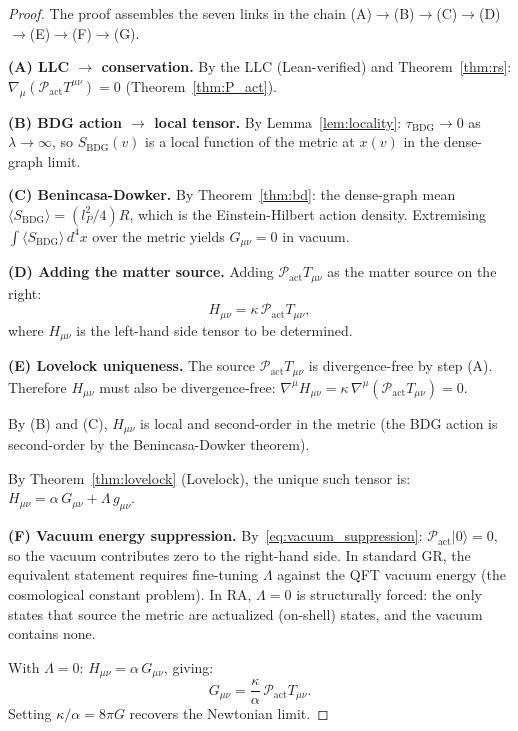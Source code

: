 \documentclass[11pt,a4paper]{article}
\newcommand{\Pact}{\mathcal{P}_{\mathrm{act}}}
\newcommand{\SBDG}{S_{\mathrm{BDG}}}
\begin{document}
\begin{proof}
The proof assembles the seven links in the chain
(A)$\to$(B)$\to$(C)$\to$(D)$\to$(E)$\to$(F)$\to$(G).

\medskip
\textbf{(A) LLC $\to$ conservation.}
By the LLC (Lean-verified) and Theorem~\ref{thm:rs}:
$\nabla_\mu(\Pact T^{\mu\nu}) = 0$ (Theorem~\ref{thm:P_act}).

\medskip
\textbf{(B) BDG action $\to$ local tensor.}
By Lemma~\ref{lem:locality}: $\tau_{\mathrm{BDG}} \to 0$ as
$\lambda \to \infty$, so $\SBDG(v)$ is a local function of the metric
at $x(v)$ in the dense-graph limit.

\medskip
\textbf{(C) Benincasa-Dowker.}
By Theorem~\ref{thm:bd}: the dense-graph mean
$\langle\SBDG\rangle = (l_P^2/4)R$, which is the Einstein-Hilbert
action density. Extremising $\int\langle\SBDG\rangle\,d^4x$ over
the metric yields $G_{\mu\nu} = 0$ in vacuum.

\medskip
\textbf{(D) Adding the matter source.}
Adding $\Pact T_{\mu\nu}$ as the matter source on the right:
\begin{equation}
  H_{\mu\nu} = \kappa\,\Pact T_{\mu\nu},
\end{equation}
where $H_{\mu\nu}$ is the left-hand side tensor to be determined.

\medskip
\textbf{(E) Lovelock uniqueness.}
The source $\Pact T_{\mu\nu}$ is divergence-free by step (A).
Therefore $H_{\mu\nu}$ must also be divergence-free:
$\nabla^\mu H_{\mu\nu} = \kappa\,\nabla^\mu(\Pact T_{\mu\nu}) = 0$.

By (B) and (C), $H_{\mu\nu}$ is local and second-order in the metric
(the BDG action is second-order by the Benincasa-Dowker theorem).

By Theorem~\ref{thm:lovelock} (Lovelock), the unique such tensor is:
$H_{\mu\nu} = \alpha\,G_{\mu\nu} + \Lambda\,g_{\mu\nu}$.

\medskip
\textbf{(F) Vacuum energy suppression.}
By~\eqref{eq:vacuum_suppression}: $\Pact|0\rangle = 0$, so the
vacuum contributes zero to the right-hand side. In standard GR, the
equivalent statement requires fine-tuning $\Lambda$ against the QFT
vacuum energy (the cosmological constant problem). In RA, $\Lambda = 0$
is structurally forced: the only states that source the metric are
actualized (on-shell) states, and the vacuum contains none.

With $\Lambda = 0$: $H_{\mu\nu} = \alpha\,G_{\mu\nu}$, giving:
\begin{equation}
  G_{\mu\nu} = \frac{\kappa}{\alpha}\,\Pact T_{\mu\nu}.
\end{equation}
Setting $\kappa/\alpha = 8\pi G$ recovers the Newtonian limit.


\end{proof}
\end{document}
